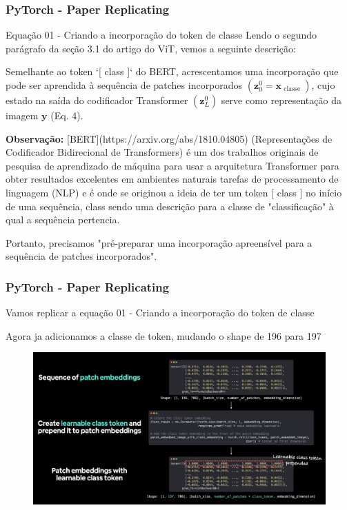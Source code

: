 \documentclass{beamer}
\begin{document}
\begin{frame}
	\frametitle{PyTorch - Paper Replicating}
	\begin{block}{Equação 01 - Criando a incorporação do token de classe}
		Lendo o segundo parágrafo da seção 3.1 do artigo do ViT, vemos a seguinte descrição:
		
		Semelhante ao token `[ class ]` do BERT, acrescentamos uma incorporação que pode ser aprendida à sequência de patches incorporados $\left(\mathbf{z}_{0}^{0}=\mathbf{x}_{\text { classe }}\right)$, cujo estado na saída do codificador Transformer $\left(\mathbf{z}_{L}^{0}\right)$ serve como representação da imagem $\mathbf{y}$ (Eq. 4).
		
		\textbf{Observação:} [BERT](https://arxiv.org/abs/1810.04805) (Representações de Codificador Bidirecional de Transformers) é um dos trabalhos originais de pesquisa de aprendizado de máquina para usar a arquitetura Transformer para obter resultados excelentes em ambientes naturais tarefas de processamento de linguagem (NLP) e é onde se originou a ideia de ter um token [ class ] no início de uma sequência, class sendo uma descrição para a classe de "classificação" à qual a sequência pertencia.
		
		Portanto, precisamos "pré-preparar uma incorporação apreensível para a sequência de patches incorporados".
		
	\end{block}
\end{frame}


\begin{frame}
	\frametitle{PyTorch - Paper Replicating}
	\begin{block}{Vamos replicar a equação 01 - Criando a incorporação do token de classe}
		
		Agora ja adicionamos a classe de token, mudando o shape de 196 para 197
		\begin{figure}
			\centering
			\includegraphics[width=0.8\linewidth]{figures/patch_embedding}
		\end{figure}
		
		
	\end{block}
\end{frame}
\end{document}
